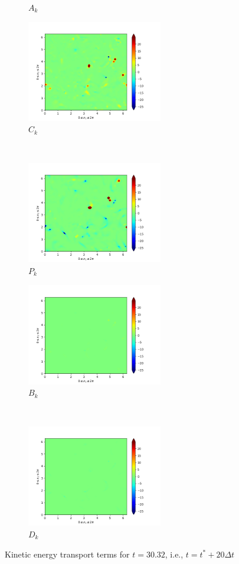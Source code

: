 \begin{figure}[H]
\begin{subfigure}{0.45\textwidth}
        \caption{$A_{k}$}
    \end{subfigure}
    \newline
    \begin{subfigure}{0.45\textwidth}
        \includegraphics[height=1.75in]{media/run-cds-65/C-ke-1360.png}
        \caption{$C_{k}$}
    \end{subfigure}
    ~
    \begin{subfigure}{0.45\textwidth}
        \includegraphics[height=1.75in]{media/run-cds-65/P-ke-1360.png}
        \caption{$P_{k}$}
    \end{subfigure}
    \newline
    \begin{subfigure}{0.45\textwidth}
        \includegraphics[height=1.75in]{media/run-cds-65/B-ke-1360.png}
        \caption{$B_{k}$}
    \end{subfigure}
    ~
    \begin{subfigure}{0.45\textwidth}
        \includegraphics[height=1.75in]{media/run-cds-65/D-ke-1360.png}
        \caption{$D_{k}$}
    \end{subfigure}
    \caption{Kinetic energy transport terms for $t=30.32$, i.e., $t=t^{\ast} + 20 \Delta t$}
\end{figure}

